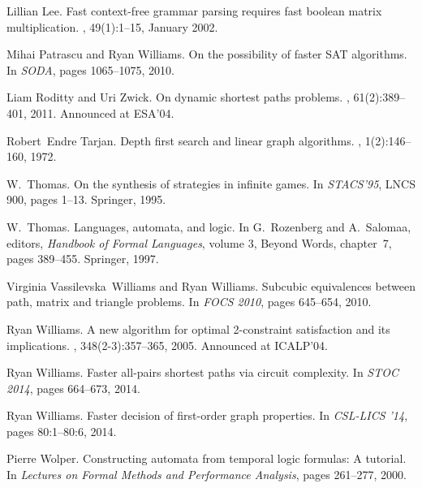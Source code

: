 \documentclass[11pt,letterpaper]{article}
\begin{document}
\begin{thebibliography}{10}
Lillian Lee.
\newblock Fast context-free grammar parsing requires fast boolean matrix
  multiplication.
, 49(1):1--15, January 2002.

Mihai Patrascu and Ryan Williams.
\newblock On the possibility of faster {SAT} algorithms.
\newblock In {\em {SODA}}, pages 1065--1075, 2010.

Liam Roditty and Uri Zwick.
\newblock On dynamic shortest paths problems.
, 61(2):389--401, 2011.
\newblock Announced at ESA'04.

Robert~Endre Tarjan.
\newblock Depth first search and linear graph algorithms.
, 1(2):146--160, 1972.

W.~Thomas.
\newblock On the synthesis of strategies in infinite games.
\newblock In {\em STACS'95}, LNCS 900, pages 1--13. Springer, 1995.

W.~Thomas.
\newblock Languages, automata, and logic.
\newblock In G.~Rozenberg and A.~Salomaa, editors, {\em Handbook of Formal
  Languages}, volume 3, Beyond Words, chapter~7, pages 389--455. Springer,
  1997.

Virginia Vassilevska~Williams and Ryan Williams.
\newblock Subcubic equivalences between path, matrix and triangle problems.
\newblock In {\em {FOCS} 2010}, pages 645--654, 2010.

Ryan Williams.
\newblock A new algorithm for optimal 2-constraint satisfaction and its
  implications.
, 348(2-3):357--365, 2005.
\newblock Announced at ICALP'04.

Ryan Williams.
\newblock Faster all-pairs shortest paths via circuit complexity.
\newblock In {\em {STOC} 2014}, pages 664--673, 2014.

Ryan Williams.
\newblock Faster decision of first-order graph properties.
\newblock In {\em {CSL-LICS} '14}, pages 80:1--80:6, 2014.

Pierre Wolper.
\newblock Constructing automata from temporal logic formulas: {A} tutorial.
\newblock In {\em Lectures on Formal Methods and Performance Analysis}, pages
  261--277, 2000.

\end{thebibliography}
\end{document}
